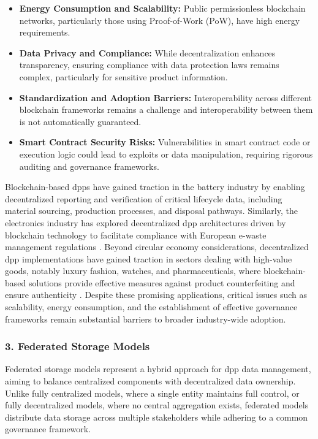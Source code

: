 \begin{itemize}[itemsep=0.5\baselineskip]
    \item \textbf{Energy Consumption and Scalability:} Public permissionless blockchain networks, particularly those using Proof-of-Work (PoW), have high energy requirements. \autocite{Androulaki.2018}
    
    \item \textbf{Data Privacy and Compliance:} While decentralization enhances transparency, ensuring compliance with data protection laws remains complex, particularly for sensitive product information. \autocite{EuropeanParliamentandCouncil.2016}
    
    \item \textbf{Standardization and Adoption Barriers:} Interoperability across different blockchain frameworks remains a challenge and interoperability between them is not automatically guaranteed. \autocite{Plociennik.2023}
    
    \item \textbf{Smart Contract Security Risks:} Vulnerabilities in smart contract code or execution logic could lead to exploits or data manipulation, requiring rigorous auditing and governance frameworks. \autocite{Hulea.2024, Nowacki.2023}
\end{itemize}

Blockchain-based \ac{dpp}s have gained traction in the battery industry by enabling decentralized reporting and verification of critical lifecycle data, including material sourcing, production processes, and disposal pathways. Similarly, the electronics industry has explored decentralized \ac{dpp} architectures driven by blockchain technology to facilitate compliance with European e-waste management regulations \autocite{Plociennik.2023}. Beyond circular economy considerations, decentralized \ac{dpp} implementations have gained traction in sectors dealing with high-value goods, notably luxury fashion, watches, and pharmaceuticals, where blockchain-based solutions provide effective measures against product counterfeiting and ensure authenticity \autocite{Nowacki.2023}. Despite these promising applications, critical issues such as scalability, energy consumption, and the establishment of effective governance frameworks remain substantial barriers to broader industry-wide adoption.

\subsubsection*{3. Federated Storage Models}
Federated storage models represent a hybrid approach for \ac{dpp} data management, aiming to balance centralized components with decentralized data ownership. Unlike fully centralized models, where a single entity maintains full control, or fully decentralized models, where no central aggregation exists, federated models distribute data storage across multiple stakeholders while adhering to a common governance framework. \autocite{Koppelaar.2023, Plociennik.2022}

